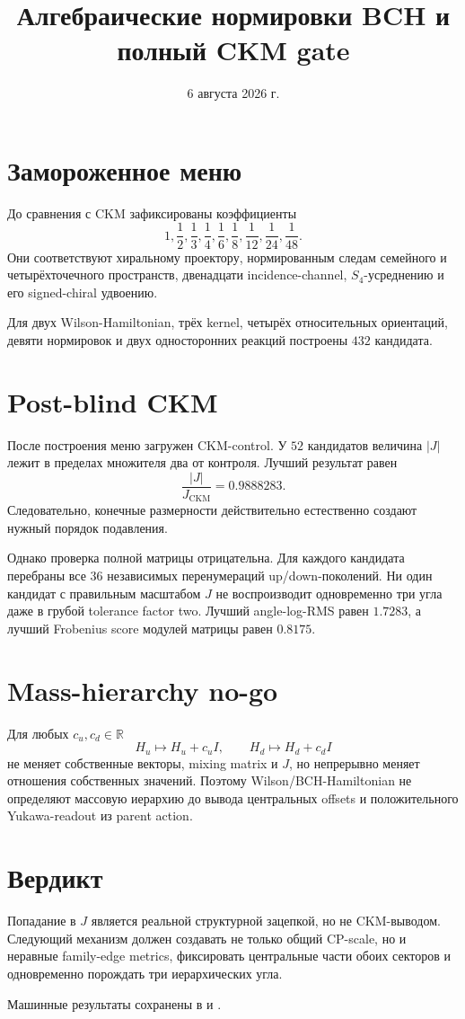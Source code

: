 \documentclass[12pt,a4paper]{article}
\title{Алгебраические нормировки BCH и полный CKM gate}
\author{}
\date{6 августа 2026 г.}
\begin{document}
\maketitle

\section{Замороженное меню}

До сравнения с CKM зафиксированы коэффициенты
\[
 1,\frac12,\frac13,\frac14,\frac16,\frac18,
 \frac1{12},\frac1{24},\frac1{48}.
\]
Они соответствуют хиральному проектору, нормированным следам семейного и
четырёхточечного пространств, двенадцати incidence-channel,
\(S_4\)-усреднению и его signed-chiral удвоению.

Для двух Wilson-Hamiltonian, трёх kernel, четырёх относительных ориентаций,
девяти нормировок и двух односторонних реакций построены \(432\) кандидата.

\section{Post-blind CKM}

После построения меню загружен CKM-control. У \(52\) кандидатов величина
\(|J|\) лежит в пределах множителя два от контроля. Лучший результат равен
\[
 \frac{|J|}{J_{\mathrm{CKM}}}=0.9888283.
\]
Следовательно, конечные размерности действительно естественно создают
нужный порядок подавления.

Однако проверка полной матрицы отрицательна. Для каждого кандидата перебраны
все \(36\) независимых перенумераций up/down-поколений. Ни один кандидат с
правильным масштабом \(J\) не воспроизводит одновременно три угла даже в
грубой tolerance factor two. Лучший angle-log-RMS равен \(1.7283\), а
лучший Frobenius score модулей матрицы равен \(0.8175\).

\section{Mass-hierarchy no-go}

Для любых \(c_u,c_d\in\mathbb R\)
\[
 H_u\mapsto H_u+c_uI,\qquad H_d\mapsto H_d+c_dI
\]
не меняет собственные векторы, mixing matrix и \(J\), но непрерывно меняет
отношения собственных значений. Поэтому Wilson/BCH-Hamiltonian не определяют
массовую иерархию до вывода центральных offsets и положительного
Yukawa-readout из parent action.

\section{Вердикт}

Попадание в \(J\) является реальной структурной зацепкой, но не CKM-выводом.
Следующий механизм должен создавать не только общий CP-scale, но и неравные
family-edge metrics, фиксировать центральные части обоих секторов и
одновременно порождать три иерархических угла.

Машинные результаты сохранены в
 и
.
\end{document}
